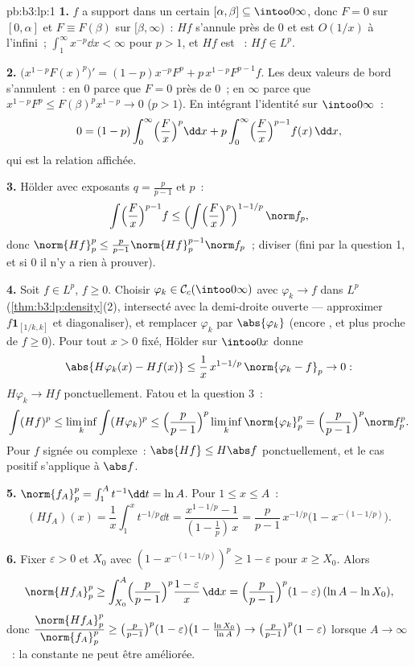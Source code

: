 \begin{solution}{pb:b3:lp:1}
\textbf{1.} $f$ a support dans un certain $[\alpha, \beta]
\subseteq \intoo0\infty$, donc $F = 0$ sur $[0, \alpha]$ et
$F \equiv F(\beta)$ sur $[\beta, \infty)$~: $Hf$ s'annule
près de $0$ et est $O(1/x)$ à l'infini~; $\int_1^\infty
x^{-p}\dd x < \infty$ pour $p > 1$, et $Hf$ est ~:
$Hf \in L^p$.

\textbf{2.} $\bigl(x^{1-p}F(x)^p\bigr)' = (1-p)x^{-p}F^p +
p\,x^{1-p}F^{p-1}f$. Les deux valeurs de bord s'annulent~:
en $0$ parce que $F = 0$ près de $0$~; en $\infty$ parce que
$x^{1-p}F^p \leq F(\beta)^p x^{1-p} \to 0$ ($p > 1$). En
intégrant l'identité sur $\intoo0\infty$~:
\[
0 = (1 - p)\int_0^\infty\Bigl(\frac Fx\Bigr)^p\dd x
+ p\int_0^\infty\Bigl(\frac Fx\Bigr)^{p-1}f(x)\,\dd x,
\]
qui est la relation affichée.

\textbf{3.} Hölder avec exposants $q = \frac p{p-1}$ et $p$~:
\[
\int\Bigl(\frac Fx\Bigr)^{p-1}f
\leq \Bigl(\int\Bigl(\frac
Fx\Bigr)^{p}\Bigr)^{1 - 1/p}\,\norm f_p ,
\]
donc $\norm{Hf}_p^p \leq \frac p{p-1}\norm{Hf}_p^{p-1}\norm
f_p$~; diviser (fini par la question 1, et si $0$ il n'y a
rien à prouver).

\textbf{4.} Soit $f \in L^p$, $f \geq 0$. Choisir $\varphi_k
\in \mathcal C_c(\intoo0\infty)$ avec $\varphi_k \to f$ dans
$L^p$ (\cref{thm:b3:lp:density}(2), intersecté avec la
demi-droite ouverte --- approximer $f\mathbf 1_{[1/k, k]}$ et
diagonaliser), et remplacer $\varphi_k$ par
$\abs{\varphi_k}$ (encore , et plus proche de $f \geq
0$). Pour tout $x > 0$ fixé, Hölder sur $\intoo0x$ donne
\[
\abs{H\varphi_k(x) - Hf(x)} \leq
\frac1x\,x^{1 - 1/p}\,\norm{\varphi_k - f}_p \to 0 :
\]
$H\varphi_k \to Hf$ ponctuellement. Fatou et la question 3~:
\[
\int (Hf)^p \leq \liminf_k\int(H\varphi_k)^p
\leq \Bigl(\frac p{p-1}\Bigr)^p\liminf_k\norm{\varphi_k}_p^p
= \Bigl(\frac p{p-1}\Bigr)^p\norm f_p^p .
\]
Pour $f$ signée ou complexe~: $\abs{Hf} \leq H\abs f$
ponctuellement, et le cas positif s'applique à $\abs f$.

\textbf{5.} $\norm{f_A}_p^p = \int_1^A t^{-1}\dd t = \ln A$.
Pour $1 \leq x \leq A$~:
\[
(Hf_A)(x) = \frac1x\int_1^x t^{-1/p}\dd t
= \frac{x^{1 - 1/p} - 1}{(1 - \tfrac1p)\,x}
= \frac p{p-1}\,x^{-1/p}\bigl(1 - x^{-(1 - 1/p)}\bigr).
\]

\textbf{6.} Fixer $\varepsilon > 0$ et $X_0$ avec $(1 -
x^{-(1-1/p)})^p \geq 1 - \varepsilon$ pour $x \geq X_0$.
Alors
\[
\norm{Hf_A}_p^p \geq \int_{X_0}^A\Bigl(\frac
p{p-1}\Bigr)^p\frac{1 - \varepsilon}{x}\,\dd x
= \Bigl(\frac p{p-1}\Bigr)^p(1 - \varepsilon)\,(\ln A - \ln
X_0),
\]
donc $\dfrac{\norm{Hf_A}_p^p}{\norm{f_A}_p^p} \geq
\bigl(\frac p{p-1}\bigr)^p(1 - \varepsilon)\bigl(1 -
\frac{\ln X_0}{\ln A}\bigr) \to \bigl(\frac
p{p-1}\bigr)^p(1 - \varepsilon)$ lorsque $A \to \infty$~: la
constante ne peut être améliorée.


\end{solution}
